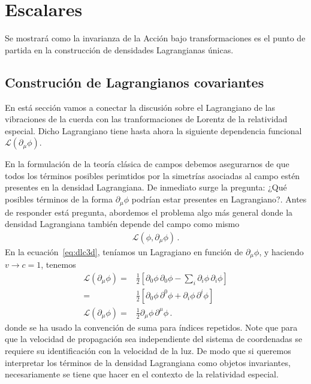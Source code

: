 \chapter{Escalares}
\label{cha:escalares}
Se mostrará como la invarianza de la Acción bajo transformaciones es el punto de partida en la construcción de densidades Lagrangianas únicas.




 

\section{Construción de Lagrangianos covariantes}
\begin{frame}
En está sección vamos a conectar la discusión sobre el Lagrangiano de las vibraciones de la cuerda con las tranformaciones de Lorentz de la relatividad especial. Dicho Lagrangiano tiene hasta ahora la siguiente dependencia funcional $\mathcal{L}(\partial_{\mu}\phi)$.

En la formulación de la teoría clásica de campos debemos asegurarnos de que todos los términos posibles perimtidos por la simetrías asociadas al campo estén presentes en la densidad Lagrangiana. De inmediato surge la pregunta: ¿Qué posibles términos de la forma $\partial_{\mu}\phi$ podrían estar presentes en Lagrangiano?. Antes de responder está pregunta, abordemos el problema algo más general donde la densidad Lagrangiana también depende del campo como mismo
\begin{align*}
  \mathcal{L}(\phi,\partial_\mu \phi)\,.
\end{align*}
En la ecuación~\eqref{eq:dlc3d}, teníamos un Lagragiano en función de $\partial_{\mu}\phi$, y haciendo $v\to c=1$, tenemos
\begin{align}
\label{eq:Lpr}
  \mathcal{L}(\partial_{\mu}\phi)
    =&\frac{1}{2}\left[
      {\partial_0\phi}\,{\partial_0\phi}-\sum_i{\partial_i\phi}\,{\partial_i\phi}
   \right]\nonumber\\
    =&\frac{1}{2}\left[
      {\partial_0\phi}\,{\partial^0\phi}+{\partial_i\phi}\,{\partial^i\phi}
   \right]\nonumber\\
 \mathcal{L}(\partial_{\mu}\phi)   =&\frac{1}{2}{\partial_\mu\phi}\,{\partial^\mu\phi}\,.
\end{align}
donde se ha usado la convención de suma para índices repetidos. Note que para que la velocidad de propagación sea independiente del sistema de coordenadas se requiere su identificación con la velocidad de la luz. De modo que si queremos interpretar los términos de la densidad Lagrangiana como objetos invariantes, necesariamente se tiene que hacer en el contexto de la relatividad especial.
\end{frame}

